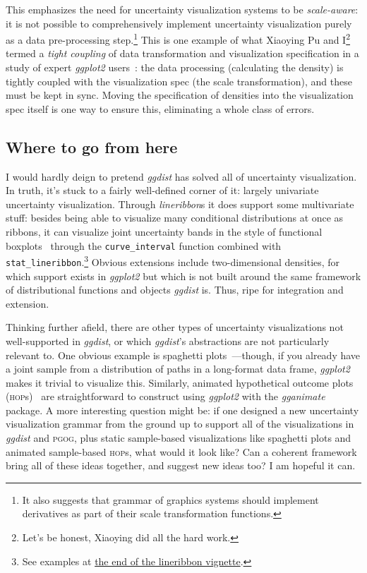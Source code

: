 \documentclass[journal]{vgtc}                     %
\begin{document}
This emphasizes the need for uncertainty visualization systems to be \textit{scale-aware}: it is not possible to comprehensively implement uncertainty visualization purely as a data pre-processing step.\footnote{It also suggests that grammar of graphics systems should implement derivatives as part of their scale transformation functions.} This is one example of what Xiaoying Pu and I\footnote{Let's be honest, Xiaoying did all the hard work.} termed a \textit{tight coupling} of data transformation and visualization specification in a study of expert \textit{ggplot2} users~\cite{pu2023inpractice}: the data processing (calculating the density) is tightly coupled with the visualization spec (the scale transformation), and these must be kept in sync. Moving the specification of densities into the visualization spec itself is one way to ensure this, eliminating a whole class of errors. 


\subsection{Where to go from here}

I would hardly deign to pretend \textit{ggdist} has solved all of uncertainty visualization. In truth, it's stuck to a fairly well-defined corner of it: largely univariate uncertainty visualization. Through \textit{lineribbon}s it does support some multivariate stuff: besides being able to visualize many conditional distributions at once as ribbons, it can visualize joint uncertainty bands in the style of functional boxplots~\cite{sun2011functional,mirzargar2014curve,juul2021fixed} through the \texttt{curve\_interval} function combined with \texttt{stat\_lineribbon}.\footnote{See examples at \href{https://mjskay.github.io/ggdist/articles/lineribbon.html\#curve-boxplots-aka-lineribbons-with-joint-intervals-or-curvewise-intervals}{the end of the lineribbon vignette}.} Obvious extensions include two-dimensional densities, for which support exists in \textit{ggplot2} but which is not built around the same framework of distributional functions and objects \textit{ggdist} is. Thus, ripe for integration and extension.

Thinking further afield, there are other types of uncertainty visualizations not well-supported in \textit{ggdist}, or which \textit{ggdist}'s abstractions are not particularly relevant to. One obvious example is spaghetti plots~\cite{cox2013visualizing,liu2018visualizing}---though, if you already have a joint sample from a distribution of paths in a long-format data frame, \textit{ggplot2} makes it trivial to visualize this. Similarly, animated hypothetical outcome plots (\textsc{hop}s)~\cite{hullman2015hypothetical,kale2018hypothetical} are straightforward to construct using \textit{ggplot2} with the \textit{gganimate} package. A more interesting question might be: if one designed a new uncertainty visualization grammar from the ground up to support all of the  visualizations in \textit{ggdist} and \textsc{pgog}, plus static sample-based visualizations like spaghetti plots and animated sample-based \textsc{hop}s, what would it look like? Can a coherent framework bring all of these ideas together, and suggest new ideas too? I am hopeful it can.
\end{document}
